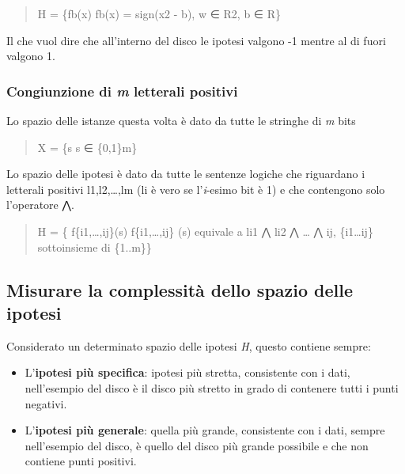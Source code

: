 \begin{quote}
H = \{fb(x) \textbar{} fb(x) =
sign(\textbar{}\textbar{}x\textbar{}\textbar{}2 - b), w ∈ R2, b ∈ R\}
\end{quote}

Il che vuol dire che all'interno del disco le ipotesi valgono -1 mentre
al di fuori valgono 1.

\subsubsection{\texorpdfstring{Congiunzione di \emph{m} letterali
positivi}{Congiunzione di m letterali positivi}}\label{congiunzione-di-m-letterali-positivi}

Lo spazio delle istanze questa volta è dato da tutte le stringhe di
\emph{m} bits

\begin{quote}
X = \{s \textbar{} s ∈ \{0,1\}m\}
\end{quote}

Lo spazio delle ipotesi è dato da tutte le sentenze logiche che
riguardano i letterali positivi l1,l2,\ldots{},lm (li è vero se
l'\emph{i}-esimo bit è 1) e che contengono solo l'operatore ⋀.

\begin{quote}
H = \{ f\{i1,\ldots{},ij\}(s) \textbar{} f\{i1,\ldots{},ij\} (s)
equivale a li1 ⋀ li2 ⋀ \ldots{} ⋀ ij, \{i1\ldots{}ij\} sottoinsieme di
\{1..m\}\}
\end{quote}

\subsection{Misurare la complessità dello spazio delle
ipotesi}\label{misurare-la-complessituxe0-dello-spazio-delle-ipotesi}

Considerato un determinato spazio delle ipotesi \emph{H}, questo
contiene sempre:

\begin{itemize}
\tightlist
\item
  L'\textbf{ipotesi più specifica}: ipotesi più stretta, consistente con
  i dati, nell'esempio del disco è il disco più stretto in grado di
  contenere tutti i punti negativi.
\item
  L'\textbf{ipotesi più generale}: quella più grande, consistente con i
  dati, sempre nell'esempio del disco, è quello del disco più grande
  possibile e che non contiene punti positivi.
\end{itemize}

